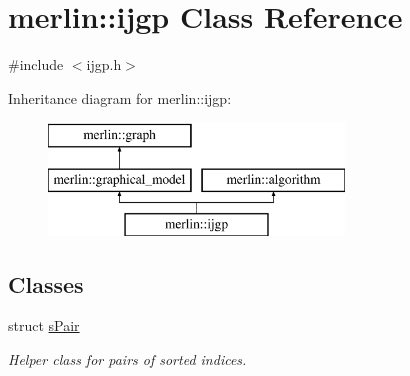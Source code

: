 \hypertarget{classmerlin_1_1ijgp}{}\section{merlin\+:\+:ijgp Class Reference}
\label{classmerlin_1_1ijgp}


{\ttfamily \#include $<$ijgp.\+h$>$}

Inheritance diagram for merlin\+:\+:ijgp\+:\begin{figure}[H]
\begin{center}
\leavevmode
\includegraphics[height=3.000000cm]{classmerlin_1_1ijgp}
\end{center}
\end{figure}
\subsection*{Classes}
\begin{DoxyCompactItemize}
\item 
struct \hyperlink{structmerlin_1_1ijgp_1_1sPair}{s\+Pair}
\begin{DoxyCompactList}\small\item\em Helper class for pairs of sorted indices. \end{DoxyCompactList}\end{DoxyCompactItemize}
